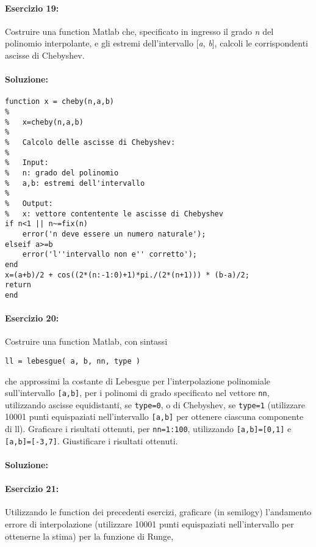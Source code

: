 \documentclass[12pt]{article}
\begin{document}
\paragraph{Esercizio 19:}
Costruire una function Matlab che, specificato in ingresso il grado \emph{n} del polinomio
interpolante, e gli estremi dell'intervallo [\emph{a}, \emph{b}], calcoli le corrispondenti ascisse di Chebyshev.

\paragraph{Soluzione:}
\begin{lstlisting}[frame=single]
function x = cheby(n,a,b)
%
%   x=cheby(n,a,b)
%
%   Calcolo delle ascisse di Chebyshev:
%
%   Input:
%   n: grado del polinomio
%   a,b: estremi dell'intervallo
%
%   Output:
%   x: vettore contentente le ascisse di Chebyshev
if n<1 || n~=fix(n)
    error('n deve essere un numero naturale');
elseif a>=b
    error('l''intervallo non e'' corretto');
end
x=(a+b)/2 + cos((2*(n:-1:0)+1)*pi./(2*(n+1))) * (b-a)/2;
return
end
\end{lstlisting}
\paragraph{Esercizio 20:}
Costruire una function Matlab, con sintassi
\begin{center}
    \texttt{ll = lebesgue( a, b, nn, type )}
\end{center}
che approssimi la costante di Lebesgue per l'interpolazione polinomiale sull'intervallo \texttt{[a,b]}, per
i polinomi di grado specificato nel vettore \texttt{nn}, utilizzando ascisse equidistanti, se \texttt{type=0}, o di
Chebyshev, se \texttt{type=1} (utilizzare 10001 punti equispaziati nell'intervallo \texttt{[a,b]} per ottenere ciascuna componente di ll). 
Graficare i risultati ottenuti, per \texttt{nn=1:100}, utilizzando \texttt{[a,b]=[0,1]} e \texttt{[a,b]=[-3,7]}. Giustificare i risultati ottenuti.

\paragraph{Soluzione:}


\paragraph{Esercizio 21:}
Utilizzando le function dei precedenti esercizi, graficare (in semilogy) l'andamento
errore di interpolazione (utilizzare 10001 punti equispaziati nell'intervallo per ottenerne la stima)
per la funzione di Runge,
\end{document}
